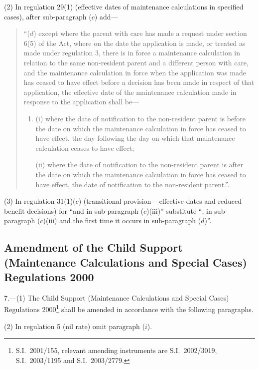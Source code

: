 \documentclass[12pt,a4paper]{article}
\begin{document}
(2) In regulation 29(1) (effective dates of maintenance calculations in specified cases), after sub-paragraph ($c$)  add—
\begin{quotation}
“($d$) except where the parent with care has made a request under section 6(5) of the Act, where on the date the application is made, or treated as made under regulation 3, there is in force a maintenance calculation in relation to the same non-resident parent and a different person with care, and the maintenance calculation in force when the application was made has ceased to have effect before a decision has been made in respect of that application, the effective date of the maintenance calculation made in response to the application shall be—
\begin{enumerate}\item[]
(i) where the date of notification to the non-resident parent is before the date on which the maintenance calculation in force has ceased to have effect, the day following the day on which that maintenance calculation ceases to have effect;

\pagebreak[3]

(ii) where the date of notification to the non-resident parent is after the date on which the maintenance calculation in force has ceased to have effect, the date of notification to the non-resident parent.”.
\end{enumerate}
\end{quotation}

(3) In regulation 31(1)($c$)  (transitional provision – effective dates and reduced benefit decisions) for “and in sub-paragraph ($c$)(iii)” substitute “, in sub-paragraph ($c$)(iii) and the first time it occurs in sub-paragraph ($d$)”.

\subsection[7. Amendment of the Child Support (Maintenance Calculations and Special Cases) Regulations 2000]{Amendment of the Child Support (Maintenance Calculations and Special Cases) Regulations 2000}

7.---(1)  The Child Support (Maintenance Calculations and Special Cases) Regulations 2000\footnote{S.I.\ 2001/155, relevant amending instruments are S.I.\ 2002/3019, S.I.\ 2003/1195 and S.I.\ 2003/2779.} shall be amended in accordance with the following paragraphs.

(2) In regulation 5 (nil rate) omit paragraph ($i$).
\end{document}
